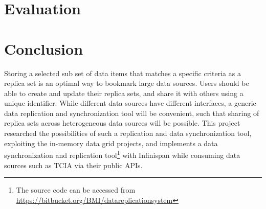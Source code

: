 \documentclass[conference]{IEEEtran}
\begin{document}
\section{Evaluation}
\section{Conclusion}
Storing a selected sub set of data items that matches a specific criteria as a replica set is an optimal way to bookmark large data sources. Users should be able to create and update their replica sets, and share it with others using a unique identifier. While different data sources have different interfaces, a generic data replication and synchronization tool will be convenient, such that sharing of replica sets across heterogeneous data sources will be possible. This project researched the possibilities of such a replication and data synchronization tool, exploiting the in-memory data grid projects, and implements a data synchronization and replication tool\footnote{The source code can be accessed from \url{https://bitbucket.org/BMI/datareplicationsystem}} with Infinispan while consuming data sources such as TCIA via their public APIs.


\end{document}
